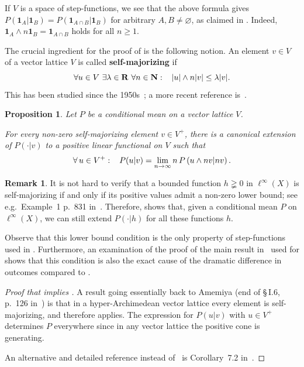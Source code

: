 \documentclass[11pt]{amsart}
\numberwithin{equation}{section}
\newtheorem{prop}[thm]{Proposition}
\theoremstyle{definition}
\newtheorem{rem}[thm]{Remark}
\theoremstyle{definition}
\newcommand*{\RR}{\mathbf{R}}
\newcommand*{\NN}{\mathbf{N}}
\newcommand*{\one}{\boldsymbol{1}}
\begin{document}
If $V$ is a space of step-functions, we see that the above formula gives $P(\one_A|\one_B)=  P(\one_{A\cap B}|\one_B)$ for arbitrary $A,B \neq \varnothing$, as claimed in . Indeed, $\one_A \wedge n \one_B = \one_{A\cap B}$ holds for all $n\geq 1$.

\medskip
The crucial ingredient for the proof of  is the following notion. An element $v\in V$ of a vector lattice $V$ is called \textbf{self-majorizing} if
\begin{equation*}
\forall u\in V \ \exists \lambda \in\RR \ \forall n\in \NN : \kern3mm |u| \wedge n |v| \leq \lambda |v|.
\end{equation*}
This has been studied since the 1950s~\cite{Amemiya53}; a more recent reference is~\cite{Teichert-Weber}.


\begin{prop}\label{prop:self-maj}
Let $P$ be a conditional mean on a vector lattice $V$.

For every non-zero self-majorizing element $v\in V^+$, there is a canonical extension of $P(\cdot | v)$ to a positive linear functional on $V$ such that
\begin{equation*}
\forall \, u\in V^+: \kern3mm P(u|v) = \lim_{n\to\infty}  n\, P\left(u \wedge n v | n v\right).
\end{equation*}
\end{prop}

\begin{rem}\label{rem:self-maj}
It is not hard to verify that a bounded function $h\gneqq 0$ in $\ell^\infty(X)$ is self-majorizing if and only if its positive values admit a non-zero lower bound; see e.g.\ Example~1 p.~831 in~\cite{Teichert-Weber}. Therefore,   shows that, given a conditional mean $P$ on $\ell^\infty(X)$, we can still extend $P(\cdot| h)$ for all these functions $h$.

Observe that this lower bound condition is the only property of step-functions used in . Furthermore, an examination of the proof of the main result in~\cite{Alhalimi-Hutchcroft-Pan-Tamuz-Zheng_pre} used for  shows that this condition is also the exact cause of the dramatic difference in outcomes compared to .
\end{rem}

\begin{proof}[Proof that  implies ]
A result going essentially back to Amemiya (end of \S\,I.6, p.~126 in~\cite{Amemiya53}) is that in a hyper-Archimedean vector lattice every element is self-majorizing, and therefore  applies. The expression for $P(u|v)$ with $u\in V^+$ determines $P$ everywhere since in any vector lattice the positive cone is generating.

An alternative and detailed reference instead of~\cite{Amemiya53} is Corollary~7.2 in~\cite{Luxemburg-Moore}.
\end{proof}
\end{document}
